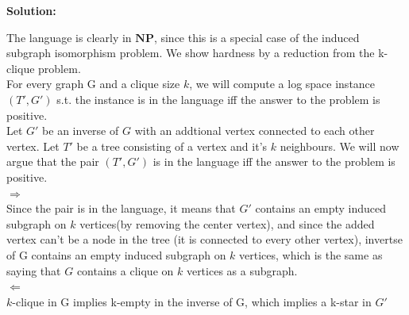 \documentclass[12pt]{article}
\newenvironment{solution}{\noindent\textbf{Solution:} \par\vspace{10pt}}{\par\vspace{10pt}}
\begin{document}
\begin{solution}
  
  The language is clearly in $\mathbf{NP}$, since this is a special case of the induced subgraph isomorphism problem. 
  We show hardness by a reduction from the k-clique problem.\\
  For every graph G and a clique size $k$, we will compute a log space instance $(T', G')$ s.t. the instance is in the language iff the answer to the problem is positive.\\ 
  Let $G'$ be an inverse of $G$ with an addtional vertex connected to each other vertex. Let $T'$ be a tree consisting of a vertex and it's $k$ neighbours. We will now argue that the pair $(T', G')$ is in the language iff the answer to the problem is positive. \\ 

$\Rightarrow$\\ 
Since the pair is in the language, it means that $G'$ contains an empty induced subgraph on $k$ vertices(by removing the center vertex), and since the added vertex can't be a node in the tree (it is connected to every other vertex), invertse of G contains an empty induced subgraph on $k$ vertices, which is the same as saying that $G$ contains a clique on $k$ vertices as a subgraph. \\

$\Leftarrow$\\
$k$-clique in G implies k-empty in the inverse of G, which implies a k-star in $G'$


\end{solution}

\vspace{20pt}
\end{document}
